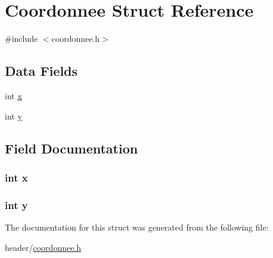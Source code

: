 \hypertarget{struct_coordonnee}{\section{Coordonnee Struct Reference}
\label{struct_coordonnee}
}


{\ttfamily \#include $<$coordonnee.\-h$>$}

\subsection*{Data Fields}
\begin{DoxyCompactItemize}
\item 
int \hyperlink{struct_coordonnee_a6150e0515f7202e2fb518f7206ed97dc}{x}
\item 
int \hyperlink{struct_coordonnee_a0a2f84ed7838f07779ae24c5a9086d33}{y}
\end{DoxyCompactItemize}


\subsection{Field Documentation}
\hypertarget{struct_coordonnee_a6150e0515f7202e2fb518f7206ed97dc}{
\subsubsection[{x}]{\setlength{\rightskip}{0pt plus 5cm}int x}}\label{struct_coordonnee_a6150e0515f7202e2fb518f7206ed97dc}
\hypertarget{struct_coordonnee_a0a2f84ed7838f07779ae24c5a9086d33}{
\subsubsection[{y}]{\setlength{\rightskip}{0pt plus 5cm}int y}}\label{struct_coordonnee_a0a2f84ed7838f07779ae24c5a9086d33}


The documentation for this struct was generated from the following file\-:\begin{DoxyCompactItemize}
\item 
header/\hyperlink{coordonnee_8h}{coordonnee.\-h}\end{DoxyCompactItemize}
